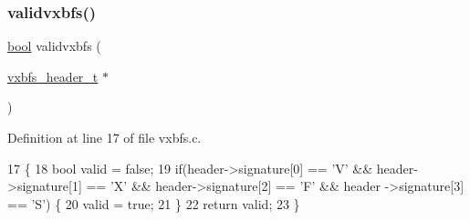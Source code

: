 \subsubsection{\texorpdfstring{validvxbfs()}{validvxbfs()}}
{\footnotesize\ttfamily \hyperlink{a00140_af6a258d8f3ee5206d682d799316314b1_af6a258d8f3ee5206d682d799316314b1}{bool} validvxbfs (\begin{DoxyParamCaption}\item[{\hyperlink{a00206_ac5678b6d5dd5ed5ca86e5ccd4c30d39d_ac5678b6d5dd5ed5ca86e5ccd4c30d39d}{vxbfs\+\_\+header\+\_\+t} $\ast$}]{ }\end{DoxyParamCaption})}



Definition at line 17 of file vxbfs.\+c.


\begin{DoxyCode}
17                                         \{
18     \textcolor{keywordtype}{bool} valid = \textcolor{keyword}{false};
19     \textcolor{keywordflow}{if}(header->signature[0] == \textcolor{charliteral}{'V'} && header->signature[1] == \textcolor{charliteral}{'X'} && header->signature[2] == \textcolor{charliteral}{'F'} && header
      ->signature[3] == \textcolor{charliteral}{'S'}) \{
20         valid = \textcolor{keyword}{true};
21     \}
22     \textcolor{keywordflow}{return} valid;
23 \}
\end{DoxyCode}

